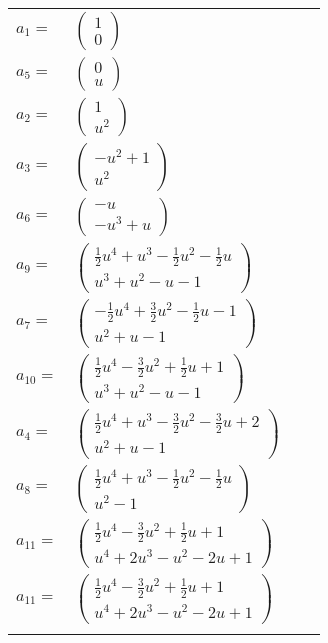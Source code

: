 \documentclass[1p]{elsarticle_modified}
\theoremstyle{definition}
\begin{document}
\begin{tabular}{m{7pt} m{180pt} m{7pt} m{180pt} }
\flushright $a_{1}=$&$\begin{pmatrix}1\\0\end{pmatrix}$ \\
\flushright $a_{5}=$&$\begin{pmatrix}0\\u\end{pmatrix}$ \\
\flushright $a_{2}=$&$\begin{pmatrix}1\\u^2\end{pmatrix}$ \\
\flushright $a_{3}=$&$\begin{pmatrix}- u^2+1\\u^2\end{pmatrix}$ \\
\flushright $a_{6}=$&$\begin{pmatrix}- u\\- u^3+u\end{pmatrix}$ \\
\flushright $a_{9}=$&$\begin{pmatrix}\frac{1}{2} u^4+u^3-\frac{1}{2} u^2-\frac{1}{2} u\\u^3+u^2- u-1\end{pmatrix}$ \\
\flushright $a_{7}=$&$\begin{pmatrix}-\frac{1}{2} u^4+\frac{3}{2} u^2-\frac{1}{2} u-1\\u^2+u-1\end{pmatrix}$ \\
\flushright $a_{10}=$&$\begin{pmatrix}\frac{1}{2} u^4-\frac{3}{2} u^2+\frac{1}{2} u+1\\u^3+u^2- u-1\end{pmatrix}$ \\
\flushright $a_{4}=$&$\begin{pmatrix}\frac{1}{2} u^4+u^3-\frac{3}{2} u^2-\frac{3}{2} u+2\\u^2+u-1\end{pmatrix}$ \\
\flushright $a_{8}=$&$\begin{pmatrix}\frac{1}{2} u^4+u^3-\frac{1}{2} u^2-\frac{1}{2} u\\u^2-1\end{pmatrix}$ \\
\flushright $a_{11}=$&$\begin{pmatrix}\frac{1}{2} u^4-\frac{3}{2} u^2+\frac{1}{2} u+1\\u^4+2 u^3- u^2-2 u+1\end{pmatrix}$\\ \flushright $a_{11}=$&$\begin{pmatrix}\frac{1}{2} u^4-\frac{3}{2} u^2+\frac{1}{2} u+1\\u^4+2 u^3- u^2-2 u+1\end{pmatrix}$\\&\end{tabular}
\end{document}
